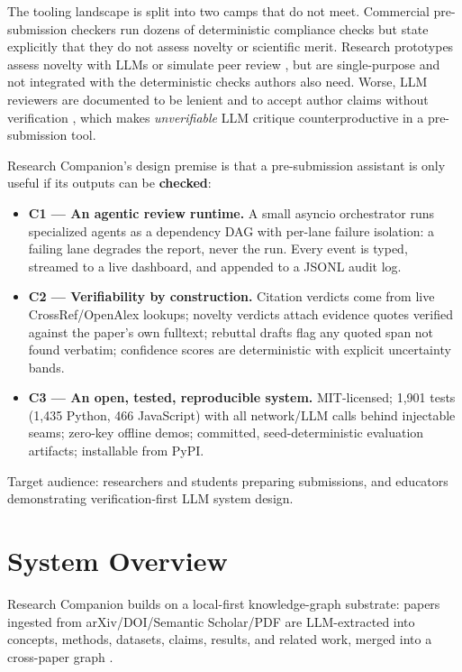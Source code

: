 \documentclass[11pt]{article}
\begin{document}
The tooling landscape is split into two camps that do not meet. Commercial pre-submission checkers \citep{paperpal,penelope} run dozens of deterministic compliance checks but state explicitly that they do not assess novelty or scientific merit. Research prototypes assess novelty with LLMs \citep{opennovelty2026,dasilva2025graphmind} or simulate peer review \citep{jin2024agentreview}, but are single-purpose and not integrated with the deterministic checks authors also need. Worse, LLM reviewers are documented to be lenient and to accept author claims without verification \citep{du2025llmreviewbias}, which makes \emph{unverifiable} LLM critique counterproductive in a pre-submission tool.

Research Companion's design premise is that a pre-submission assistant is only useful if its outputs can be \textbf{checked}:
\begin{itemize}\itemsep0pt
\item \textbf{C1 --- An agentic review runtime.} A small asyncio orchestrator runs specialized agents as a dependency DAG with per-lane failure isolation: a failing lane degrades the report, never the run. Every event is typed, streamed to a live dashboard, and appended to a JSONL audit log.
\item \textbf{C2 --- Verifiability by construction.} Citation verdicts come from live CrossRef/OpenAlex lookups; novelty verdicts attach evidence quotes verified against the paper's own fulltext; rebuttal drafts flag any quoted span not found verbatim; confidence scores are deterministic with explicit uncertainty bands.
\item \textbf{C3 --- An open, tested, reproducible system.} MIT-licensed; 1{,}901 tests (1{,}435 Python, 466 JavaScript) with all network/LLM calls behind injectable seams; zero-key offline demos; committed, seed-deterministic evaluation artifacts; installable from PyPI.
\end{itemize}
Target audience: researchers and students preparing submissions, and educators demonstrating verification-first LLM system design.

\section{System Overview}
Research Companion builds on a local-first knowledge-graph substrate: papers ingested from arXiv/DOI/Semantic Scholar/PDF are LLM-extracted into concepts, methods, datasets, claims, results, and related work, merged into a cross-paper graph \citep[cf.][]{edge2024graphrag}.
\end{document}
